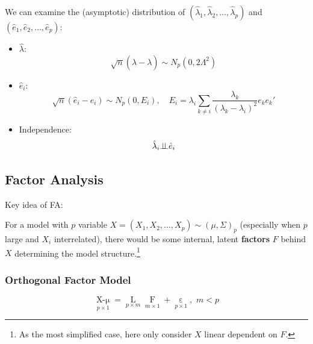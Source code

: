     We can examine the (asymptotic) distribution of $ (\hat{\lambda} _{1},\hat{\lambda} _{2},\ldots,\hat{\lambda} _{p})  $ and $ (\hat{e}_{1},\hat{e}_{2},\ldots,\hat{e}_{p})  $:
    \begin{itemize}[topsep=2pt,itemsep=2pt]
        \item $ \hat{\lambda } $:
        \begin{equation}
            \sqrt{n}(\hat{\lambda }-\lambda )\sim N_p(0,2\Lambda ^2) 
        \end{equation}
        \item $ \hat{e}_i $:
        \begin{equation}
            \sqrt{n}(\hat{e}_i-e_i)\sim N_p(0,E_i),\quad E_i=\lambda _i\sum_{k\neq i}\dfrac{\lambda _k}{(\lambda _k-\lambda _i)^2}e_ke_k' 
        \end{equation}
        \item Independence:
        \begin{equation}
            \hat{\lambda }_i\bot\!\!\!\bot \hat{e}_i 
        \end{equation}
        
    \end{itemize}
    
        










\subsection{Factor Analysis}
    \hypertarget{SubSectionFA}{Key idea of FA:} For a model with $ p $ variable $ X=(X_{1},X_{2},\ldots,X_{p})\sim (\mu ,\Sigma )_p  $ (especially when $ p $ large and $ X_i $ interrelated), there would be some internal, latent \textbf{factors} $ F $ behind $ X $ determining the model structure.\footnote{As the most simplified case, here only consider $ X $ linear dependent on $ F $.}


\subsubsection{Orthogonal Factor Model}
    
    \begin{equation}
        \mathop{X-\mu}\limits_{p\times 1}=\mathop{L}\limits_{p\times m}\mathop{F}\limits_{m\times 1} +\mathop{\varepsilon }\limits_{p\times 1} ,\,\, m<p 
    \end{equation}
    
